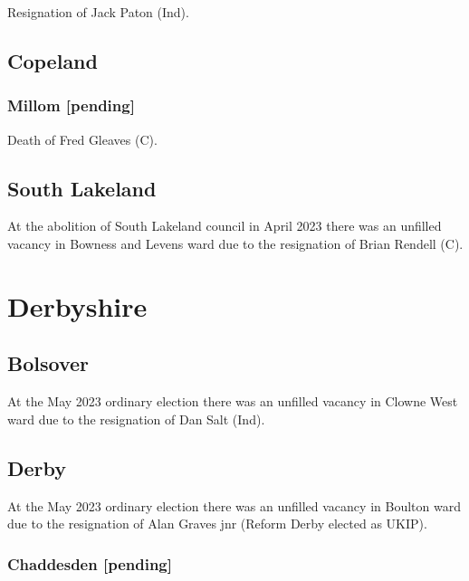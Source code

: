 \documentclass[a4paper,openany]{book}
\begin{document}
\begin{resultsiii}
Resignation of Jack Paton (Ind).

\subsection*{Copeland}

\subsubsection*{Millom \hspace*{\fill}\nolinebreak[1]%
	\enspace\hspace*{\fill}
	[pending]}


Death of Fred Gleaves (C).

\subsection*{South Lakeland}

At the abolition of South Lakeland council in April 2023 there was an unfilled vacancy in Bowness and Levens ward due to the resignation of Brian Rendell (C).%

\section{Derbyshire}

\subsection*{Bolsover}

At the May 2023 ordinary election there was an unfilled vacancy in Clowne West ward due to the resignation of Dan Salt (Ind).%

\subsection*{Derby}

At the May 2023 ordinary election there was an unfilled vacancy in Boulton ward due to the resignation of Alan Graves jnr (Reform Derby elected as UKIP).%

\subsubsection*{Chaddesden \hspace*{\fill}\nolinebreak[1]%
	\enspace\hspace*{\fill}
	[pending]}


\end{resultsiii}
\end{document}

